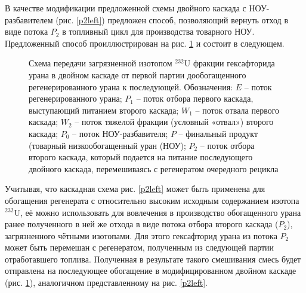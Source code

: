 {В качестве модификации предложенной схемы двойного каскада с НОУ-разбавителем (рис. \ref{p2left}) предложен способ, позволяющий вернуть отход в виде потока $P_2$ в топливный цикл для производства товарного НОУ. Предложенный способ проиллюстрирован на рис. \ref{P2utilizationRing} и состоит в следующем.

\begin{figure}[ht]
    \caption{Схема передачи загрязненной изотопом $^{232}$U фракции гексафторида урана в двойном каскаде от первой партии дообогащенного регенерированного урана к последующей. Обозначения: $E$ -- поток регенерированного урана; $P_1$ -- поток отбора первого каскада, выступающий питанием второго каскада; $W_1$ -- поток отвала первого каскада; $W_2$ -- поток тяжелой фракции (условный «отвал») второго каскада; $P_0$ -- поток НОУ-разбавителя; $P$ -- финальный продукт (товарный низкообогащенный уран (НОУ); $P_2$ -- поток отбора второго каскада, который подается на питание последующего двойного каскада, перемешиваясь с регенератом очередного рецикла}\label{P2utilizationRing}
\end{figure}

Учитывая, что каскадная схема рис. \ref{p2left} может быть применена для обогащения регенерата с относительно высоким исходным содержанием изотопа $^{232}$U, её можно использовать для вовлечения в производство обогащенного урана ранее полученного в ней же отхода в виде потока отбора второго каскада ($P_2$), загрязненного чётными изотопами. Для этого гексафторид урана из потока $P_2$ может быть перемешан с регенератом, полученным из следующей партии отработавшего топлива. Полученная в результате такого смешивания смесь будет отправлена на последующее обогащение в модифицированном двойном каскаде (рис. \ref{P2utilizationRing}), аналогичном представленному на рис. \ref{p2left}.

}
